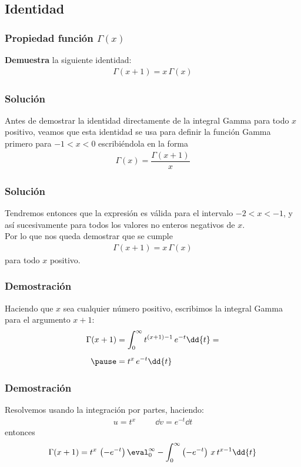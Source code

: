 \subsection{Identidad}
\begin{frame}
\frametitle{Propiedad función $\Gamma(x)$}
\textbf{Demuestra} la siguiente identidad:
\begin{align*}
\Gamma (x + 1) = x \, \Gamma (x)
\end{align*}
\end{frame}
\begin{frame}
\frametitle{Solución}
Antes de demostrar la identidad directamente de la integral Gamma para todo $x$ positivo, veamos que esta identidad se usa para definir la función Gamma primero para $-1 < x < 0$ escribiéndola en la forma 
\begin{align*}
\Gamma(x) = \dfrac{\Gamma (x + 1)}{x}
\end{align*}
\end{frame}
\begin{frame}
\frametitle{Solución}
Tendremos entonces que la expresión es válida para el intervalo $-2 < x < -1$, y así sucesivamente para todos los valores no enteros negativos de $x$.
\\
\bigskip
\pause
Por lo que nos queda demostrar que se cumple
\begin{align*}
\Gamma (x + 1) =  x \, \Gamma (x)
\end{align*}
para todo $x$ positivo.
\end{frame}
\begin{frame}
\frametitle{Demostración}
Haciendo que $x$ sea cualquier número positivo, escribimos la integral Gamma para el argumento $x + 1$:
\begin{eqnarray*}
\Gamma (x + 1) &= \displaystyle \int_{0}^{\infty} t^{(x+1)-1} \, e^{-t} \dd{t} = \\[0.5em] \pause
&= t^{x} \, e^{-t} \dd{t}
\end{eqnarray*}
\end{frame}
\begin{frame}
\frametitle{Demostración}
Resolvemos usando la integración por partes, haciendo:
\begin{align*}
u = t^{x} \hspace{1cm} \dd{v} = e^{-t} \dd{t}
\end{align*}
entonces
\pause
\begin{align*}
\Gamma (x + 1) = t^{x} \, \left( - e^{-t}\right)\eval_{0}^{\infty} - \int_{0}^{\infty} \left( -e^{-t}\right) \, x \, t^{x-1} \dd{t}
\end{align*}
\end{frame}

